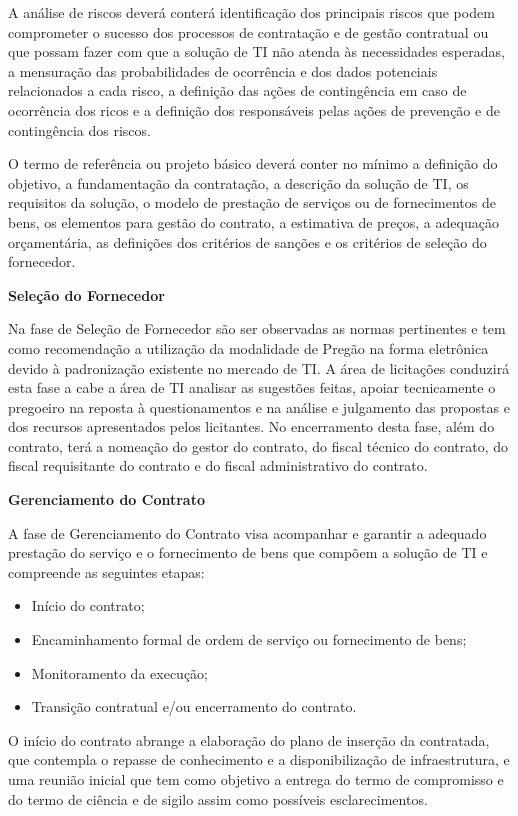 A análise de riscos deverá conterá identificação dos principais riscos que podem comprometer o sucesso dos processos de contratação e de gestão contratual ou que possam fazer com que a solução de TI não atenda às necessidades esperadas, a mensuração das probabilidades de ocorrência e dos dados potenciais relacionados a cada risco, a definição das ações de contingência em caso de ocorrência dos ricos e a definição dos responsáveis pelas ações de prevenção e de contingência dos riscos.

O termo de referência ou projeto básico deverá conter no mínimo a definição do objetivo, a fundamentação da contratação, a descrição da solução de TI, os requisitos da solução, o modelo de prestação de serviços ou de fornecimentos de bens, os elementos para gestão do contrato, a estimativa de preços, a adequação orçamentária, as definições dos critérios de sanções e os critérios de seleção do fornecedor. 

\textbf {Seleção do Fornecedor}

Na fase de Seleção de Fornecedor são ser observadas as normas pertinentes e tem como recomendação a utilização da modalidade de Pregão na forma eletrônica devido à padronização existente no mercado de TI.  A área de licitações conduzirá esta fase a cabe a área de TI analisar as sugestões feitas, apoiar tecnicamente o pregoeiro na reposta à questionamentos e na análise e julgamento das propostas e dos recursos apresentados pelos licitantes. No encerramento desta fase, além do contrato, terá a nomeação do gestor do contrato, do fiscal técnico do contrato, do fiscal requisitante do contrato e do fiscal administrativo do contrato.

\textbf {Gerenciamento do Contrato}

A fase de Gerenciamento do Contrato visa acompanhar e garantir a adequado prestação do serviço e o fornecimento de bens que compõem a solução de TI e compreende as seguintes etapas: \begin{itemize}
\item Início do contrato; 
\item Encaminhamento formal de ordem de serviço ou fornecimento de bens; 
\item Monitoramento da execução; 
\item Transição contratual e/ou encerramento do contrato. 
\end{itemize}

O início do contrato abrange a elaboração do plano de inserção da contratada, que contempla o repasse de conhecimento e a disponibilização de infraestrutura, e uma reunião inicial que tem como objetivo a entrega do termo de compromisso e do termo de ciência e de sigilo assim como possíveis esclarecimentos. 


